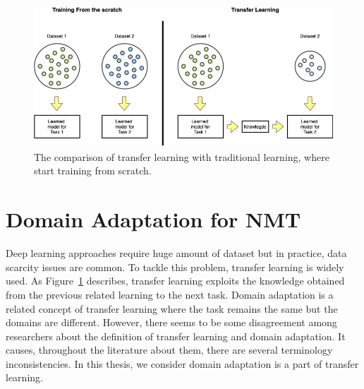 



\begin{figure}[hb!]
    \centering
    \includegraphics[scale=0.50]{images/transfer_learning.png}
    \caption{The comparison of transfer learning with traditional learning, where start training from scratch.}
    \label{fig:transfer_learning}
\end{figure}

\section{Domain Adaptation for NMT}\label{section:transfer_learning}

Deep learning approaches require huge amount of dataset but in practice, data scarcity issues are common. To tackle this problem, transfer learning is widely used. As Figure~\ref{fig:transfer_learning} describes, transfer learning exploits the knowledge obtained from the previous related learning to the next task. Domain adaptation is a related concept of transfer learning where the task remains the same but the domains are different. However, there seems to be some disagreement among researchers about the definition of transfer learning and domain adaptation. It causes, throughout the literature about them, there are several terminology inconsistencies. In this thesis, we consider domain adaptation is a part of transfer learning.

